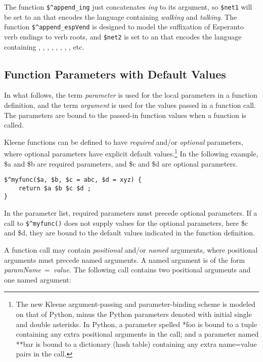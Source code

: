 The function \verb!$^append_ing! just concatenates \emph{ing} to
its \fsm{} argument, so \verb!$net1! will be set to an \fsm{} that
encodes the language containing \emph{walking} and \emph{talking}.
The function \verb!$^append_espVend! is designed to model the
suffixation of Esperanto verb endings to verb roots, and
\verb!$net2! is set to an \fsm{} that encodes the language
containing , , ,
, , , , , etc.


\subsection{Function Parameters with Default Values}

In what follows, the term \emph{parameter} is used for the local
parameters in a function definition, and the term \emph{argument} is
used for the values passed in a function call.  The parameters are bound to the passed-in 
function values when a function
is called.

Kleene functions can be defined to have \emph{required} and/or \emph{optional}
parameters, where optional parameters have explicit default
values.\footnote{The new Kleene argument-passing and parameter-binding scheme
is modeled on that of Python, minus the Python parameters denoted with
initial single and double asterisks.  In Python, a parameter spelled
*foo is bound to a tuple containing any extra positional arguments in
the call; and
a parameter named **bar is bound to a dictionary (hash table) containing any
extra name=value pairs in the call.} In
the following example, \$a and \$b are required parameters, and \$c and
\$d are optional parameters.

\begin{Verbatim}
$^myfunc($a, $b, $c = abc, $d = xyz) {
	return $a $b $c $d ;
}
\end{Verbatim}

\noindent
In the parameter list, required parameters must precede optional parameters.
If a call to \verb!$^myfunc()! does not supply values for the optional
parameters, here \$c and \$d, they are bound to the default values indicated
in the function definition.

A function call may contain \emph{positional} and/or \emph{named}
arguments, where positional arguments must precede named arguments.  A
named argument is of the form \emph{paramName}~=~\emph{value}.
The following call contains two positional arguments and one named
argument:

